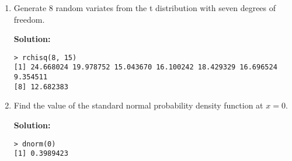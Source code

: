 \documentclass[11pt]{article} %
\begin{document}
\begin{enumerate}
\begin{enumerate}
\item Generate 8 random variates from the t distribution with seven degrees of freedom.

{\bf Solution:}\begin{verbatim}
> rchisq(8, 15)
[1] 24.668024 19.978752 15.043670 16.100242 18.429329 16.696524  9.354511
[8] 12.682383
\end{verbatim}

\item Find the value of the standard normal probability density function at $x = 0$.

{\bf Solution:}\begin{verbatim}
> dnorm(0)
[1] 0.3989423
\end{verbatim}

\end{enumerate}

\end{enumerate}
\end{document}
